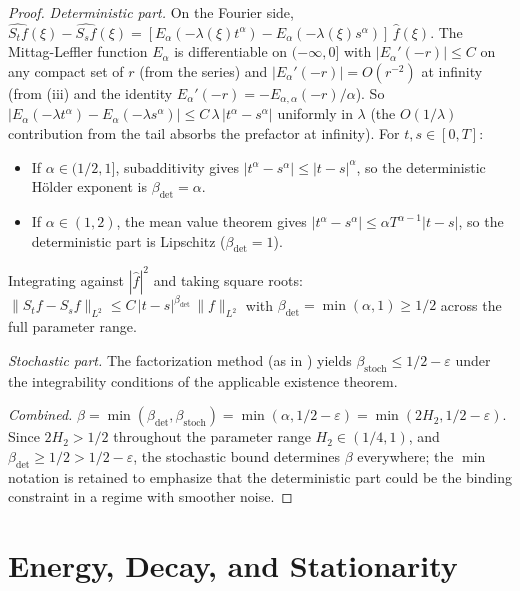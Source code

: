\documentclass[11pt]{article}
\theoremstyle{definition}
\theoremstyle{remark}
\newcommand{\norm}[1]{\| #1 \|}
\begin{document}
\begin{proof}
\emph{Deterministic part.}  On the Fourier side,
$\widehat{S_t f}(\xi) - \widehat{S_s f}(\xi)
= [E_\alpha(-\lambda(\xi) t^\alpha)
- E_\alpha(-\lambda(\xi) s^\alpha)]\,\hat{f}(\xi)$.
The Mittag-Leffler function $E_\alpha$ is
differentiable on $(-\infty, 0]$ with
$|E_\alpha'(-r)| \leq C$ on any compact set of $r$
(from the series) and $|E_\alpha'(-r)| = O(r^{-2})$
at infinity (from (iii) and
the identity
$E_\alpha'(-r) = -E_{\alpha,\alpha}(-r)/\alpha$).
So $|E_\alpha(-\lambda t^\alpha)
- E_\alpha(-\lambda s^\alpha)|
\leq C\,\lambda\,|t^\alpha - s^\alpha|$
uniformly in $\lambda$ (the $O(1/\lambda)$
contribution from the tail absorbs the prefactor at
infinity).  For $t, s \in [0, T]$:
\begin{itemize}[leftmargin=*]
\item If $\alpha \in (1/2, 1]$, subadditivity gives
  $|t^\alpha - s^\alpha| \leq |t-s|^\alpha$, so the
  deterministic Hölder exponent is
  $\beta_{\mathrm{det}} = \alpha$.
\item If $\alpha \in (1, 2)$, the mean value theorem
  gives $|t^\alpha - s^\alpha|
  \leq \alpha T^{\alpha-1}|t-s|$, so the
  deterministic part is Lipschitz
  ($\beta_{\mathrm{det}} = 1$).
\end{itemize}
Integrating against $|\hat{f}|^2$ and taking square
roots: $\norm{S_t f - S_s f}_{L^2}
\leq C\,|t-s|^{\beta_{\mathrm{det}}}\,\norm{f}_{L^2}$
with $\beta_{\mathrm{det}} = \min(\alpha, 1) \geq 1/2$
across the full parameter range.

\emph{Stochastic part.}  The factorization method
(as in ) yields
$\beta_{\mathrm{stoch}} \leq 1/2 - \varepsilon$
under the integrability conditions of the applicable
existence theorem.

\emph{Combined.}  $\beta = \min(\beta_{\mathrm{det}},
\beta_{\mathrm{stoch}}) = \min(\alpha, 1/2-\varepsilon)
= \min(2H_2, 1/2-\varepsilon)$.  Since
$2H_2 > 1/2$ throughout the parameter range
$H_2 \in (1/4, 1)$, and $\beta_{\mathrm{det}} \geq 1/2
> 1/2 - \varepsilon$, the stochastic bound
determines $\beta$ everywhere; the $\min$ notation
is retained to emphasize that the deterministic
part could be the binding constraint in a regime
with smoother noise.
\end{proof}

\section{Energy, Decay, and Stationarity}\label{sec:energy}
\end{document}
